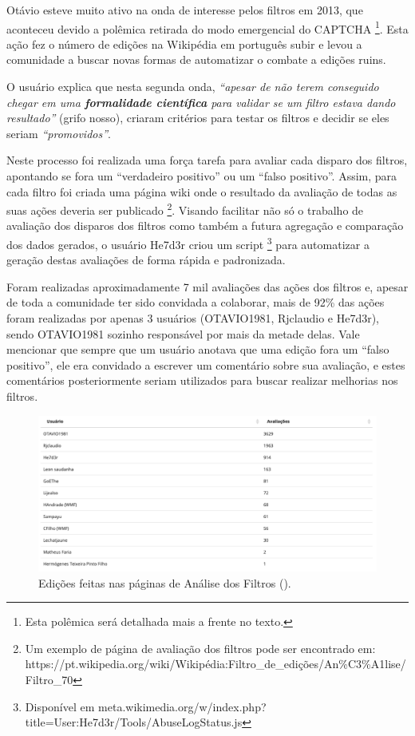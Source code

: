 Otávio esteve muito ativo na onda de interesse pelos filtros em 2013, que aconteceu devido a polêmica retirada do modo emergencial do CAPTCHA \footnote{Esta polêmica será detalhada mais a frente no texto.}. Esta ação fez o número de edições na Wikipédia em português subir e levou a comunidade a buscar novas formas de automatizar o combate a edições ruins.

O usuário explica que nesta segunda onda, \textit{``apesar de não terem conseguido chegar em uma \textbf{formalidade científica} para validar se um filtro estava dando resultado''} (grifo nosso), criaram critérios para testar os filtros e decidir se eles seriam \textit{``promovidos''}.

Neste processo foi realizada uma força tarefa para avaliar cada disparo dos filtros, apontando se fora um ``verdadeiro positivo'' ou um ``falso positivo''. Assim, para cada filtro foi criada uma página wiki onde o resultado da avaliação de todas as suas ações deveria ser publicado \footnote{Um exemplo de página de avaliação dos filtros pode ser encontrado em: https://pt.wikipedia.org/wiki/Wikipédia:Filtro\_de\_edições/An\%C3\%A1lise/Filtro\_70}. Visando facilitar não só o trabalho de avaliação dos disparos dos filtros como também a futura agregação e comparação dos dados gerados, o usuário He7d3r criou um script \footnote{Disponível em meta.wikimedia.org/w/index.php?title=User:He7d3r/Tools/AbuseLogStatus.js} para automatizar a geração destas avaliações de forma rápida e padronizada.

Foram realizadas aproximadamente 7 mil avaliações das ações dos filtros e, apesar de toda a comunidade ter sido convidada a colaborar, mais de 92\% das ações foram realizadas por apenas 3 usuários (OTAVIO1981, Rjclaudio e He7d3r), sendo OTAVIO1981 sozinho responsável por mais da metade delas. Vale mencionar que sempre que um usuário anotava que uma edição fora um ``falso positivo'', ele era convidado a escrever um comentário sobre sua avaliação, e estes comentários posteriormente seriam utilizados para buscar realizar melhorias nos filtros.

\begin{figure}[H]
    \centering
    \includegraphics[width=1\textwidth]{Images/pagina_analise_filtros.png}
    \caption{Edições feitas nas páginas de Análise dos Filtros (\cite{quarry_users_evaluating_filters}).}
    \label{fig:pagina_analise_filtros}
\end{figure}

